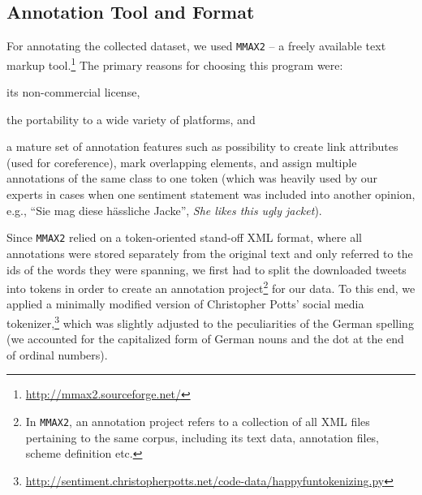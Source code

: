 \subsection{Annotation Tool and Format}\label{subsec:snt:tformat}

For annotating the collected dataset, we used \texttt{MMAX2} -- a
freely available text markup
tool.\footnote{\url{http://mmax2.sourceforge.net/}} The primary
reasons for choosing this program were:
\begin{inparaenum}
 \item its non-commercial license,
 \item the portability to a wide variety of platforms, and
 \item a mature set of annotation features such as possibility to
   create link attributes (used for coreference), mark overlapping
   elements, and assign multiple annotations of the same class to one
   token (which was heavily used by our experts in cases when one
   sentiment statement was included into another opinion, e.g., ``Sie
   mag diese h\"assliche Jacke'', \emph{She likes this ugly jacket}).
\end{inparaenum}

Since \texttt{MMAX2} relied on a token-oriented stand-off XML format,
where all annotations were stored separately from the original text
and only referred to the ids of the words they were spanning, we first
had to split the downloaded tweets into tokens in order to create an
annotation project\footnote{In \texttt{MMAX2}, an annotation project
  refers to a collection of all XML files pertaining to the same
  corpus, including its text data, annotation files, scheme definition
  etc.} for our data.  To this end, we applied a minimally modified
version of Christopher Potts' social media
tokenizer,\footnote{\url{http://sentiment.christopherpotts.net/code-data/happyfuntokenizing.py}}
which was slightly adjusted to the peculiarities of the German
spelling (we accounted for the capitalized form of German nouns and
the dot at the end of ordinal numbers).


